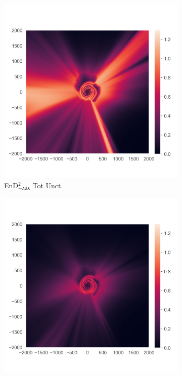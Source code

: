 \begin{figure}
\begin{subfigure}{0.22\textwidth}
  \centering
  \includegraphics[trim=42 45 15 55, clip, width=\linewidth]{../openreview/plots/3g.png}
  \caption{EnD$^2_{\texttt{+AUX}}$ Tot Unct.}
  \label{fig:3g}
\end{subfigure}%
\begin{subfigure}{0.22\textwidth}
  \centering
  \includegraphics[trim=42 45 15 55, clip, width=\linewidth]{../openreview/plots/3h.png}

\end{subfigure}
\end{figure}
